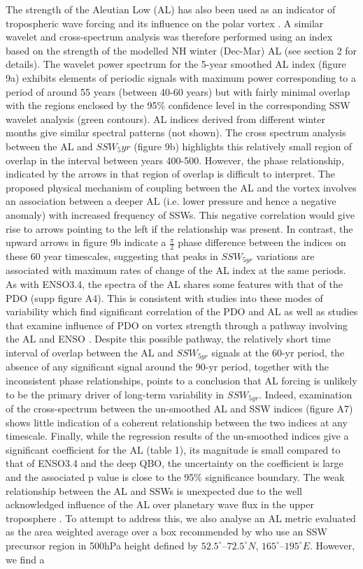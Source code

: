 \documentclass[wcd, manuscript]{copernicus}
\begin{document}
The strength of the Aleutian Low (AL) has also been used as an indicator of tropospheric wave forcing and its influence on the polar vortex \citep{Woo2015}. A similar wavelet and cross-spectrum analysis was therefore performed using an index based on the strength of the modelled NH winter (Dec-Mar) AL (see section 2 for details). The wavelet power spectrum for the 5-year smoothed AL index (figure 9a) exhibits elements of periodic signals with maximum power corresponding to a period of around 55 years (between 40-60 years) but with fairly minimal overlap with the regions enclosed by the 95\% confidence level in the corresponding SSW wavelet analysis (green contours). AL indices derived from different winter months give similar spectral patterns (not shown).  The cross spectrum analysis between the AL and $SSW_5yr$ (figure 9b) highlights this relatively small region of overlap in the interval between years 400-500. However, the phase relationship, indicated by the arrows in that region of overlap is difficult to interpret. The proposed physical mechanism of coupling between the AL and the vortex \citep{Woo2015} involves an association between a deeper AL (i.e. lower pressure and hence a negative anomaly) with increased frequency of SSWs. This negative correlation would give rise to arrows pointing to the left if the relationship was present. In contrast, the upward arrows in figure 9b indicate a $\frac{\pi}{2}$ phase difference between the indices on these 60 year timescales, suggesting that peaks in $SSW_{5yr}$ variations are associated with maximum rates of change of the AL index at the same periods. As with ENSO3.4, the spectra of the AL shares some features with that of the PDO (supp figure A4). This is consistent with studies into these modes of variability which find significant correlation of the PDO and AL \citep{Mantua_1997, Rodionov2005} as well as studies that examine influence of PDO on vortex strength through a pathway involving the AL and ENSO \citep{rao2019}. Despite this possible pathway, the relatively short time interval of overlap between the AL and $SSW_{5yr}$ signals at the 60-yr period, the absence of any significant signal around the 90-yr period, together with the inconsistent phase relationships, points to a conclusion that AL forcing is unlikely to be the primary driver of long-term variability in $SSW_{5yr}$. Indeed, examination of the cross-spectrum between the un-smoothed AL and SSW indices (figure A7) shows little indication of a coherent relationship between the two indices at any timescale. Finally, while the regression results of the un-smoothed indices give a significant coefficient for the AL (table 1), its magnitude is small compared to that of ENSO3.4 and the deep QBO, the uncertainty on the coefficient is large and the associated p value is close to the 95\% significance boundary. The weak relationship between the AL and SSWs is unexpected due to the well acknowledged influence of the AL over planetary wave flux in the upper troposphere \citep{Woo2015}. To attempt to address this, we also analyse an AL metric evaluated as the area weighted average over a box recommended by \cite{Garfinkel2012whymight} who use an SSW precursor region in 500hPa height defined by $52.5^{\circ}$–$72.5^{\circ}N$, $165^{\circ}$–$195^{\circ}E$. However, we find a 
\end{document}
